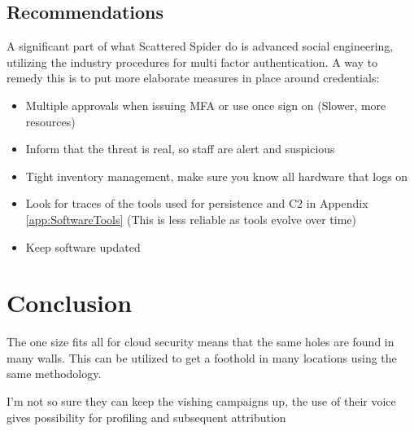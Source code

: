 \documentclass[
	letterpaper, %
	10pt, %
	unnumberedsections, %
	twoside, %
]{APAAssignment}
\begin{document}
\subsection{Recommendations}
A significant part of what Scattered Spider do is advanced social engineering, utilizing the industry procedures for multi factor authentication. A way to remedy this is to put more elaborate measures in place around credentials:
\begin{itemize}
	\item Multiple approvals when issuing MFA or use once sign on (Slower, more resources)
	\item Inform that the threat is real, so staff are alert and suspicious
	\item Tight inventory management, make sure you know all hardware that logs on
	\item Look for traces of the tools used for persistence and C2 in Appendix \ref{app:SoftwareTools} (This is less reliable as tools evolve over time)
	\item Keep software updated
\end{itemize}


\section{Conclusion}
The one size fits all for cloud security means that the same holes are found in many walls. This can be utilized to get a foothold in many locations using the same methodology.

I'm not so sure they can keep the vishing campaigns up, the use of their voice gives possibility for profiling and subsequent attribution

\clearpage


\printbibliography %





\appendix
\end{document}
